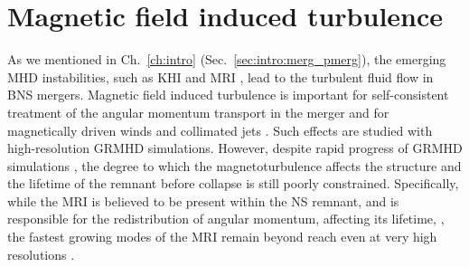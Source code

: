 


\section{Magnetic field induced turbulence}\label{sec:nr_methds:visc}

As we mentioned in Ch.~\ref{ch:intro} (Sec.~\ref{sec:intro:merg_pmerg}),
the emerging \ac{MHD} instabilities, such as \ac{KHI} 
and \ac{MRI} \citep{Balbus:1991}, lead to the turbulent 
fluid flow in \ac{BNS} mergers.
%
Magnetic field induced turbulence is important for 
self-consistent treatment of the angular momentum transport in the merger
\citep{Duez:2006qe,Kiuchi:2014hja,Guilet:2016sqd,Kiuchi:2017zzg}
and for magnetically driven winds and collimated jets 
\citep{Rezzolla:2011da,Bucciantini:2011kx,Siegel:2014ita,Ruiz:2016rai,Metzger:2018uni}.
%
Such effects are studied with high-resolution \ac{GRMHD} simulations. 
However, despite rapid progress of \ac{GRMHD} simulations 
\citep[\eg][]{Rezzolla:2011da,Kiuchi:2014hja,Ruiz:2016rai},
the degree to which the magnetoturbulence affects the structure and the 
lifetime of the remnant before collapse is still poorly constrained.
%
Specifically, while the \ac{MRI} is believed to be present within the 
\pmerg{} \ac{NS} remnant, and is responsible for the redistribution of angular 
momentum, affecting 
its lifetime, \citep[\eg][]{Duez:2006qe,Siegel:2013nrw}, 
the fastest growing modes of the \ac{MRI} remain beyond 
reach even at very high resolutions \citep[\eg][]{Kiuchi:2014hja}.
%
